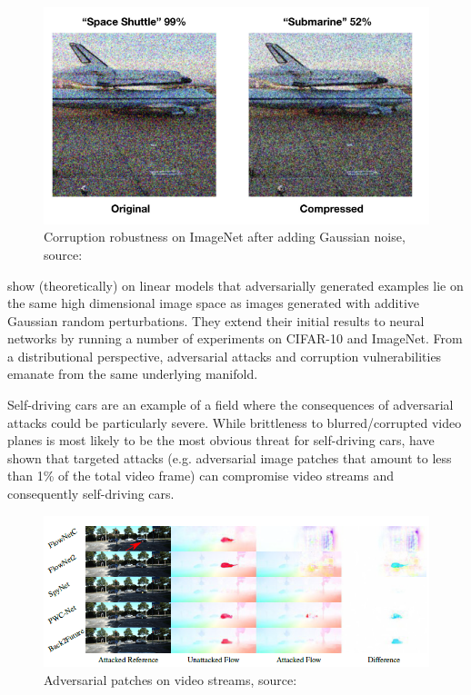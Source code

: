\begin{figure}[H]
	\centering
	\includegraphics[scale=0.85]{images/adversarial_attacks/Adv_Fig_003_Gaussian_Noise.PNG}
	\caption{Corruption robustness on ImageNet after adding Gaussian noise, source: \cite{ford2019adversarial}}
	\label{fig:Adv_003_Fig}
\end{figure}

\vspace{0.2cm}

\cite{ford2019adversarial} show (theoretically) on linear models that adversarially generated examples lie on the same high dimensional image space as images generated with additive Gaussian random perturbations. They extend their initial results to neural networks by running a number of experiments on CIFAR-10 and ImageNet. From a distributional perspective, adversarial attacks and corruption vulnerabilities emanate from the same underlying manifold.

Self-driving cars are an example of a field where the consequences of adversarial attacks could be particularly severe. While brittleness to blurred/corrupted video planes is most likely to be the most obvious threat for self-driving cars, \cite{Ranjan2019AttackingOF} have shown that targeted attacks (e.g. adversarial image patches that amount to less than 1\% of the total video frame) can compromise video streams and consequently self-driving cars.

\vspace{0.2cm}


\begin{figure}[H]
	\centering
	\includegraphics[scale=0.94]{images/adversarial_attacks/Adv_Fig_004_Self_Driving_Cars.PNG}
	\caption{Adversarial patches on video streams, source: \cite{Ranjan2019AttackingOF}}
	\label{fig:Adv_004_Fig}
\end{figure}

